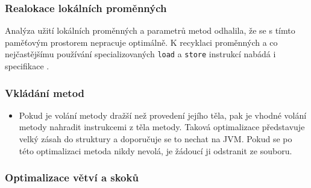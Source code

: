 \subsubsection{Realokace lokálních proměnných}
Analýza užití lokálních proměnných a parametrů metod odhalila, že se s tímto paměťovým prostorem nepracuje optimálně. K recyklaci proměnných a co nejčastějšímu používání specializovaných \texttt{load} a \texttt{store} instrukcí nabádá i specifikace \cite{Lindholm:JVM}.

\subsubsection{Vkládání metod}

\begin{itemize}
\item Pokud je volání metody dražší než provedení jejího těla, pak je vhodné volání metody nahradit instrukcemi z těla metody. Taková optimalizace představuje velký zásah do struktury a doporučuje se to nechat na JVM. Pokud se po této optimalizaci metoda nikdy nevolá, je žádoucí ji odstranit ze souboru.
\end{itemize}

\subsubsection{Optimalizace větví a skoků}


